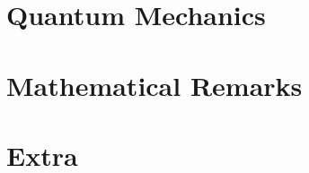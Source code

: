\chapter{Quantum Mechanics}




\chapter{Mathematical Remarks}



\chapter{Extra}








\renewcommand{\emph}[1]{\textit{#1}}
\printbibliography


